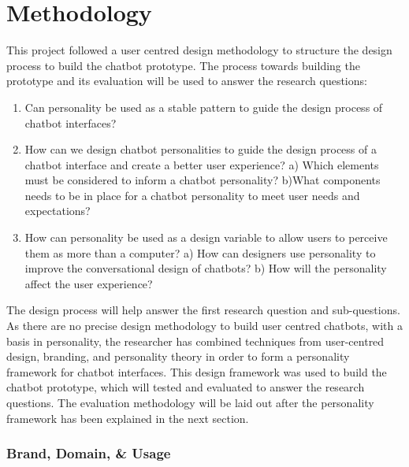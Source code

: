 \chapter{Methodology}
\label{chap:methodology}

This project followed a user centred design methodology to structure the design process to build the chatbot prototype. The process towards building the prototype and its evaluation will be used to answer the research questions:

\begin{enumerate}
    \item Can personality be used as a stable pattern to guide the design process of chatbot interfaces?
    \item How can we design chatbot personalities to guide the design process of a chatbot interface and create a better user experience? 
        \subitem a) Which elements must be considered to inform a chatbot personality?
        \subitem b)What components needs to be in place for a chatbot personality to meet user needs and expectations?
    \item How can personality be used as a design variable to allow users to perceive them as more than a computer?
        \subitem a) How can designers use personality to improve the conversational design of chatbots?
        \subitem b) How will the personality affect the user experience? %
\end{enumerate}

The design process will help answer the first research question and sub-questions. As there are no precise design methodology to build user centred chatbots, with a basis in personality, the researcher has combined techniques from user-centred design, branding, and personality theory in order to form a personality framework for chatbot interfaces. This design framework was used to build the chatbot prototype, which will tested and evaluated to answer the research questions. The evaluation methodology will be laid out after the personality framework has been explained in the next section.

\vspace{5mm} %

\subsection{Brand, Domain, \& Usage}

